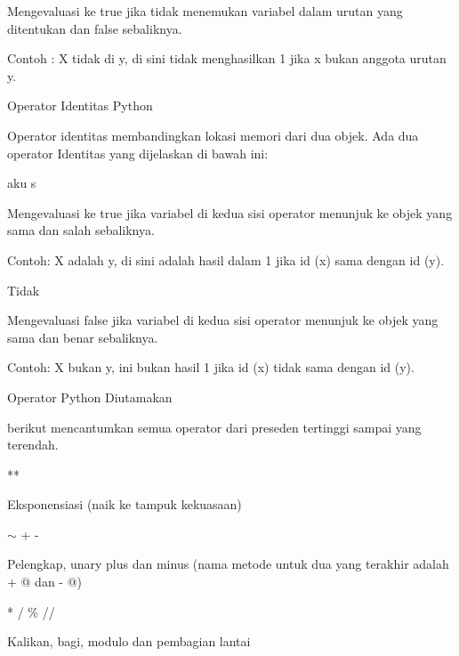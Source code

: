 \noindent 
Mengevaluasi ke true jika tidak menemukan variabel dalam urutan yang ditentukan dan false sebaliknya. \par
\noindent 
Contoh : X tidak di y, di sini tidak menghasilkan 1 jika x bukan anggota urutan y. \par
\vspace{12pt}
\noindent 
Operator Identitas Python \par
\vspace{12pt}
\noindent 
Operator identitas membandingkan lokasi memori dari dua objek. $  $Ada dua operator Identitas yang dijelaskan di bawah ini: \par
\vspace{12pt}
\noindent 
aku s \par
\noindent 
Mengevaluasi ke true jika variabel di kedua sisi operator menunjuk ke objek yang sama dan salah sebaliknya. \par
\noindent 
Contoh: X adalah y, di sini $  $adalah $  $hasil dalam 1 jika id (x) sama dengan id (y). \par
\vspace{12pt}
\noindent 
Tidak \par
\noindent 
Mengevaluasi false jika variabel di kedua sisi operator menunjuk ke objek yang sama dan benar sebaliknya. \par
\noindent 
Contoh: X bukan y, $  $ini bukan $  $hasil 1 jika id (x) tidak sama dengan id (y). \par
\vspace{12pt}
\noindent 
Operator Python Diutamakan \par
\vspace{12pt}
\noindent 
 berikut mencantumkan semua operator dari preseden tertinggi sampai yang terendah. \par
\vspace{12pt}
\noindent 
** \par
\noindent 
Eksponensiasi (naik ke tampuk kekuasaan) \par
\vspace{12pt}
\noindent 
 $  \sim  $ + - \par
\noindent 
Pelengkap, unary plus dan minus (nama metode untuk dua yang terakhir adalah + @ dan - @) \par
\vspace{12pt}
\noindent 
* / $  \%  $ // \par
\noindent 
Kalikan, bagi, modulo dan pembagian lantai \par
\vspace{12pt}
\noindent 
